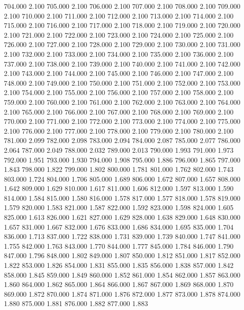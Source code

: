 704.000 2.100 
705.000 2.100 
706.000 2.100 
707.000 2.100 
708.000 2.100 
709.000 2.100 
710.000 2.100 
711.000 2.100 
712.000 2.100 
713.000 2.100 
714.000 2.100 
715.000 2.100 
716.000 2.100 
717.000 2.100 
718.000 2.100 
719.000 2.100 
720.000 2.100 
721.000 2.100 
722.000 2.100 
723.000 2.100 
724.000 2.100 
725.000 2.100 
726.000 2.100 
727.000 2.100 
728.000 2.100 
729.000 2.100 
730.000 2.100 
731.000 2.100 
732.000 2.100 
733.000 2.100 
734.000 2.100 
735.000 2.100 
736.000 2.100 
737.000 2.100 
738.000 2.100 
739.000 2.100 
740.000 2.100 
741.000 2.100 
742.000 2.100 
743.000 2.100 
744.000 2.100 
745.000 2.100 
746.000 2.100 
747.000 2.100 
748.000 2.100 
749.000 2.100 
750.000 2.100 
751.000 2.100 
752.000 2.100 
753.000 2.100 
754.000 2.100 
755.000 2.100 
756.000 2.100 
757.000 2.100 
758.000 2.100 
759.000 2.100 
760.000 2.100 
761.000 2.100 
762.000 2.100 
763.000 2.100 
764.000 2.100 
765.000 2.100 
766.000 2.100 
767.000 2.100 
768.000 2.100 
769.000 2.100 
770.000 2.100 
771.000 2.100 
772.000 2.100 
773.000 2.100 
774.000 2.100 
775.000 2.100 
776.000 2.100 
777.000 2.100 
778.000 2.100 
779.000 2.100 
780.000 2.100 
781.000 2.099 
782.000 2.098 
783.000 2.094 
784.000 2.087 
785.000 2.077 
786.000 2.064 
787.000 2.049 
788.000 2.032 
789.000 2.013 
790.000 1.993 
791.000 1.973 
792.000 1.951 
793.000 1.930 
794.000 1.908 
795.000 1.886 
796.000 1.865 
797.000 1.843 
798.000 1.822 
799.000 1.802 
800.000 1.781 
801.000 1.762 
802.000 1.743 
803.000 1.724 
804.000 1.706 
805.000 1.689 
806.000 1.672 
807.000 1.657 
808.000 1.642 
809.000 1.629 
810.000 1.617 
811.000 1.606 
812.000 1.597 
813.000 1.590 
814.000 1.584 
815.000 1.580 
816.000 1.578 
817.000 1.577 
818.000 1.578 
819.000 1.579 
820.000 1.583 
821.000 1.587 
822.000 1.592 
823.000 1.598 
824.000 1.605 
825.000 1.613 
826.000 1.621 
827.000 1.629 
828.000 1.638 
829.000 1.648 
830.000 1.657 
831.000 1.667 
832.000 1.676 
833.000 1.686 
834.000 1.695 
835.000 1.704 
836.000 1.713 
837.000 1.722 
838.000 1.731 
839.000 1.739 
840.000 1.747 
841.000 1.755 
842.000 1.763 
843.000 1.770 
844.000 1.777 
845.000 1.784 
846.000 1.790 
847.000 1.796 
848.000 1.802 
849.000 1.807 
850.000 1.812 
851.000 1.817 
852.000 1.822 
853.000 1.826 
854.000 1.831 
855.000 1.835 
856.000 1.838 
857.000 1.842 
858.000 1.845 
859.000 1.849 
860.000 1.852 
861.000 1.854 
862.000 1.857 
863.000 1.860 
864.000 1.862 
865.000 1.864 
866.000 1.867 
867.000 1.869 
868.000 1.870 
869.000 1.872 
870.000 1.874 
871.000 1.876 
872.000 1.877 
873.000 1.878 
874.000 1.880 
875.000 1.881 
876.000 1.882 
877.000 1.883 
